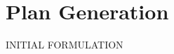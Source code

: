 \documentclass{article}
\begin{document}



\FloatBarrier
\section{Plan Generation}
INITIAL FORMULATION

%
%
%
\end{document}
